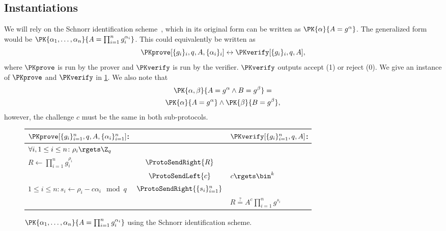 \subsection{Instantiations}


We will rely on the Schnorr identification scheme~\cite{Schnorr}, which in its 
original form can be written as \(\PK{\alpha}{A = g^\alpha}\).
The generalized form would be \(\PK{\alpha_1, \dotsc, \alpha_n}{A = 
    \prod_{i=1}^n g_i^{\alpha_i}}\).
This could equivalently be written as
\begin{equation*}
  \PKprove[\{g_i\}_i, q, A, \{\alpha_i\}_i] \leftrightarrow
  \PKverify[\{g_i\}_i, q, A],
\end{equation*}
where \(\PKprove\) is run by the prover and \(\PKverify\) is run by the 
verifier.
\(\PKverify\) outputs accept (1) or reject (0).
We give an instance of \(\PKprove\) and \(\PKverify\) in \cref{PKalgorithms}.
We also note that
\begin{multline*}
  \PK{\alpha, \beta}{A = g^\alpha \land B = g^\beta} = \\
  \PK{\alpha}{A = g^\alpha} \land \PK{\beta}{B = g^\beta},
\end{multline*}
however, the challenge \(c\) must be the same in both sub-protocols.

\begin{figure*}
  \centering
  \begin{tabular}{lcl}
    \(\PKprove[\{g_i\}_{i=1}^n, q, A, \{\alpha_i\}_{i=1}^n]\):
    &
    & \(\PKverify[\{g_i\}_{i=1}^n, q, A]\):
    \\
    \midrule

    \(\forall i, 1\leq i\leq n\colon \rho_i\rgets \Z_q\)
    &
    &
    \\

    \(R\gets \prod_{i=1}^n g_i^{\rho_i}\)
    & \(\ProtoSendRight{R}\)
    &
    \\

    & \(\ProtoSendLeft{c}\)
    & \(c\rgets \bin^k\)
    \\

    \(1\leq i\leq n\colon s_i\gets \rho_i - c\alpha_i \mod q\)
    & \(\ProtoSendRight{\{s_i\}_{i=1}^n}\)
    &
    \\

    &
    & \(R \stackrel{?}{=} A^c \prod_{i=1}^n g^{s_i}\)
    \\
    
  \end{tabular}
  \caption{%
    \(\PK{\alpha_1, \dotsc, \alpha_n}{A = \prod_{i=1}^n g_i^{\alpha_i}}\) using 
    the Schnorr identification scheme.
  }%
  \label{PKalgorithms}
\end{figure*}

